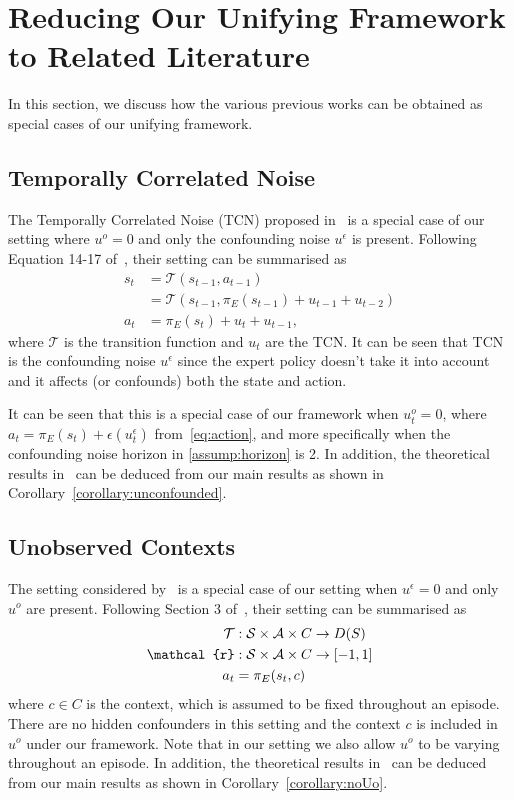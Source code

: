 
\section{Reducing Our Unifying Framework to Related Literature}\label{appendix:reduce}


In this section, we discuss how the various previous works can be obtained as special cases of %
our unifying framework.

\subsection{Temporally Correlated Noise~\citep{Swamy2022_temporal}}

The Temporally Correlated Noise (TCN) proposed in~\citet{Swamy2022_temporal} is a special case of our setting where $u^o=0$ and only the confounding noise $u^\epsilon$ is present. Following Equation 14-17 of~\citet{Swamy2022_temporal}, their setting can be summarised as
\begin{align*}
s_t &= \mathcal{T}(s_{t-1}, a_{t-1})\\
  &= \mathcal{T}(s_{t-1}, \pi_E(s_{t-1}) + u_{t-1} + u_{t-2})\\
a_t &= \pi_E(s_t) + u_t + u_{t-1},
\end{align*}
where $\mathcal{T}$ is the transition function and $u_t$ are the TCN. It can be seen that TCN is the confounding noise $u^\epsilon$ since the expert policy doesn't take it into account and it affects (or confounds) both the state and action.


It can be seen that this is a special case of our framework when  $u^o_t=0$, where $a_t=\pi_E(s_t)+\epsilon(u^\epsilon_t)$ from~\cref{eq:action}, and more specifically when the confounding noise horizon in \cref{assump:horizon} is 2. In addition, the theoretical results in~\citet{Swamy2022_temporal} can be deduced from our main results as shown in Corollary~\ref{corollary:unconfounded}.


\subsection{Unobserved Contexts~\citep{Swamy2022}}
The setting considered by~\citet{Swamy2022} is a special case of our setting when $u^\epsilon=0$ and only $u^o$ are present. Following Section 3 of~\citet{Swamy2022}, their setting can be summarised as
\begin{align*}
\mathcal{T}&:\states\times\actions\times C \rightarrow D(S)\\
\mathcal{r}&:\states\times\actions\times C \rightarrow [-1,1]\\
a_t&=\pi_E(\state_t,c)
\end{align*}
where $c\in C$ is the context, which is assumed to be fixed throughout an episode. There are no hidden confounders in this setting and the context $c$ is included in $u^o$ under our framework. Note that in our setting we also allow $u^o$ to be varying throughout an episode. In addition, the theoretical results in~\citet{Swamy2022} can be deduced from our main results as shown in Corollary~\ref{corollary:noUo}.



